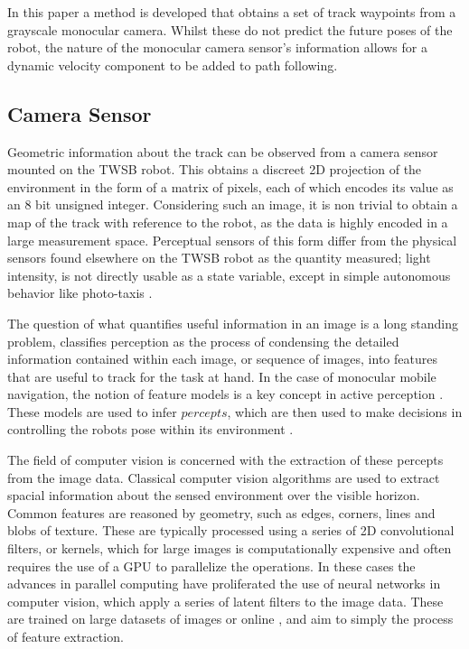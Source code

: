         In this paper a method is developed that obtains a set of track waypoints from a grayscale monocular camera. 
        Whilst these do not predict the future poses of the robot, the nature of the 
        monocular camera sensor's information allows for a dynamic velocity component to be added to path following.

        \subsection{Camera Sensor}
        Geometric information about the track can be observed from a camera sensor mounted on the TWSB robot.
        This obtains a discreet 2D projection of the environment in the form of a matrix of pixels, each of which encodes 
        its value as an 8 bit unsigned integer. Considering such an image, it is non trivial to
        obtain a map of the track with reference to the robot, as the data is highly encoded in a large measurement space. 
        Perceptual sensors of this form differ from the physical sensors found elsewhere on the TWSB robot as the quantity measured; 
        light intensity, is not directly usable as a state variable, except in simple autonomous behavior like photo-taxis \cite{hasslacher1995living}. 

        The question of what quantifies useful information in an image is a long standing problem,  \cite{siegwart2011introduction} classifies 
        perception as the process of condensing the detailed information contained within each image, or sequence of images, 
        into features that are useful to track for the task at hand.
        In the case of monocular mobile navigation, the notion of feature models is a key concept in active perception \cite{Activeperception}.
        These models are used to infer $\textit{percepts}$, which are then used to make decisions in controlling the robots pose within its environment 
        \cite{hutchinson1996tutorial}. 

        The field of computer vision is concerned with the extraction of these percepts from the image data. 
        Classical computer vision algorithms are used to extract spacial information about the sensed environment over the visible 
        horizon. Common features are reasoned by geometry, \cite{lee2009geometric} such as edges, corners, lines and blobs of texture. 
        These are typically processed using a series of 2D convolutional filters, or kernels, which for large images is
        computationally expensive and often requires the use of a GPU to parallelize the operations. In these cases the
        advances in parallel computing have proliferated the use of neural networks in computer vision, which apply a 
        series of latent filters to the image data. These are trained on large datasets of images 
        or online \cite{tai2017virtual} \cite{lee2013line} \cite{kober2013reinforcement}, and aim to simply the process of feature extraction. 
        
